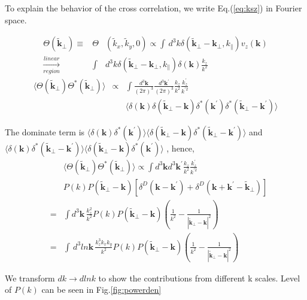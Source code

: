 To explain the behavior of the cross correlation, we write Eq.(\ref{eq:ksz}) in Fourier space.

\begin{eqnarray}
    \Theta(\tilde{\bm{k}}_\perp)\equiv&\Theta&(\tilde{k}_x,\tilde{k}_y,0)\propto\int\, d^3k\delta(\tilde{\bm{k}}_\perp-\bm{k_\perp},k_\parallel) v_z(\bm{k})\nonumber\\
    \xrightarrow[region]{linear}&\int& d^3k\delta(\tilde{\bm{k}}_\perp-\bm{k_\perp},k_\parallel)\delta(\bm{k})\frac{k_z}{k^2}
    \end{eqnarray}
\begin{eqnarray}
    \langle\Theta(\tilde{\bm{k}}_\perp)\Theta^{\ast}(\tilde{\bm{k}}_\perp)\rangle
    &\propto&\int \frac{d^3 \bm{k}}{(2\pi)^3}\frac{d^3 \bm{k^\prime}}{(2\pi)^3}
    \frac{k_z}{k^2}\frac{k^\prime_z}{k^{\prime2}}\\
    &&\langle \delta(\bm{k})\delta(\tilde{\bm{k}}_\perp-\bm{k})
    \delta^\ast(\bm{k^\prime})\delta^\ast(\tilde{\bm{k}}_\perp-\bm{k^\prime})\rangle
    \nonumber
\end{eqnarray}

The dominate term is 
$
    \langle \delta(\bm{k})\delta^\ast(\bm{k^\prime}) \rangle
    \langle \delta(\tilde{\bm{k}}_\perp-\bm{k})
    \delta^\ast(\tilde{\bm{k}}_\perp-\bm{k^\prime})\rangle
$ and 
$
    \langle \delta(\bm{k})
    \delta^\ast(\tilde{\bm{k}}_\perp-\bm{k^\prime})\rangle
    \langle \delta(\tilde{\bm{k}}_\perp-\bm{k})
    \delta^\ast(\bm{k^\prime}) \rangle
$
, hence, 
\begin{eqnarray}
    &&\langle\Theta(\tilde{\bm{k}}_\perp)\Theta^{\ast}(\tilde{\bm{k}}_\perp)\rangle
    \propto\int d^3 \bm{k}d^3 \bm{k^\prime}
    \frac{k_z}{k^2}\frac{k^\prime_z}{k^{\prime2}}
    \nonumber\\
    &&P(k)P(\tilde{\bm{k}}_\perp-\bm{k})
    [\delta^D(\bm{k}-\bm{k^\prime})+\delta^D(\bm{k}+\bm{k^\prime}-\tilde{\bm{k}}_\perp)]\nonumber\\
    &=&\int d^3 \bm{k}\, \frac{k_z^2}{k^2}
    P(k)P(\tilde{\bm{k}}_\perp-\bm{k})
    (\frac{1}{k^2}-\frac{1}{|\tilde{\bm{k}}_\perp-\bm{k}|^2})\\
    &=&\int\, d^3ln\bm{k}\, \frac{k_z^3k_xk_y}{k^2}
    P(k)P(\tilde{\bm{k}}_\perp-\bm{k})
    (\frac{1}{k^2}-\frac{1}{|\tilde{\bm{k}}_\perp-\bm{k}|^2})\nonumber
\end{eqnarray}

    We transform $dk\rightarrow dlnk$ 
    to show the contributions from different k scales.
    Level of $P(k)$ can be seen in Fig.\ref{fig:powerden}

